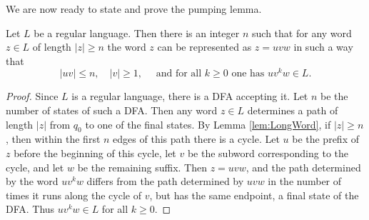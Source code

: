 \begin{page}
\setcounter{section}{3}
\setcounter{subsection}{2}
\setcounter{dfn}{3}
\label{portion:996}


We are now ready to state and prove the pumping lemma.


\end{page}

\begin{page}
\setcounter{section}{3}
\setcounter{subsection}{2}
\setcounter{dfn}{4}
\label{portion:998}

\begin{thm}
Let $L$ be a regular language.
Then there is an integer $n$ such that for any word $z \in L$ of length $|z| \ge n$ the word $z$ can be represented as $z = uvw$ in such a way that
\[
|uv| \le n, \quad |v| \ge 1, \quad \text{ and for all }k \ge 0 \text{ one has } uv^kw \in L.
\]
\end{thm}

\end{page}

\begin{page}
\setcounter{section}{3}
\setcounter{subsection}{2}
\setcounter{dfn}{4}
\label{portion:999}

\begin{proof}
Since $L$ is a regular language, there is a DFA accepting it.
Let $n$ be the number of states of such a DFA.
Then any word $z \in L$ determines a path of length $|z|$ from $q_0$ to one of the final states.
By Lemma \ref{lem:LongWord}, if $|z| \ge n$, then within the first $n$ edges of this path there is a cycle.
Let $u$ be the prefix of $z$ before the beginning of this cycle, let $v$ be the subword corresponding to the cycle, and let $w$ be the remaining suffix.
Then $z = uvw$, and the path determined by the word $uv^kw$ differs from the path determined by $uvw$ in the number of times it runs along the cycle of $v$,
but has the same endpoint, a final state of the DFA.
Thus $uv^kw \in L$ for all $k \ge 0$.
\end{proof}


\end{page}

